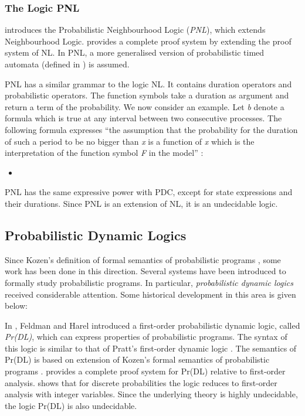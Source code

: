 \documentclass[11pt]{article}
\begin{document}
\subsubsection{The Logic PNL}

\cite{Gue00b} introduces the Probabilistic Neighbourhood Logic (\textit{PNL}), which extends Neighbourhood Logic.
\cite{Gue00b} provides a complete proof system by extending the proof system of NL. In PNL, a more generalised version of probabilistic timed automata (defined in \cite{HC94}) is assumed. 

PNL has a similar grammar to the logic NL. It contains duration operators and probabilistic operators. The function symbols take a duration as argument and return a term of the probability. We now consider an example. Let \emph{b} denote a formula which is true at any interval between two consecutive processes. The following formula expresses ``the assumption that the probability for the duration of such a period to be no bigger than \emph{x} is a function of \emph{x} which is the interpretation of the function symbol \emph{F} in the model''  \cite{Gue00c}:

\begin{itemize}
\item 
\end{itemize}

PNL has the same expressive power with PDC, except for state expressions and their durations. Since PNL is an extension of NL, it is an undecidable logic.

\subsection{Probabilistic Dynamic Logics}

Since Kozen's definition of formal semantics of probabilistic programs  \cite{Koz79}, some work has been done in this direction. Several systems have been introduced to formally study probabilistic programs. In particular, \emph{probabilistic dynamic logics} received considerable attention. Some historical development in this area is given below:

In \cite{FH82}, Feldman and Harel introduced a first-order probabilistic dynamic logic, called \emph{Pr(DL)}, which can express properties of probabilistic programs. The syntax of this logic is similar to that of Pratt's first-order dynamic logic \cite{Pra76}. The semantics of Pr(DL) is based on extension of Kozen's formal semantics of probabilistic programs \cite{Koz79}. \cite{FH82} provides a complete proof system for Pr(DL) relative to first-order analysis. \cite{FH82} shows that for discrete probabilities the logic reduces to first-order analysis with integer variables.  Since the underlying theory is highly undecidable, the logic  Pr(DL) is also undecidable.
\end{document}

